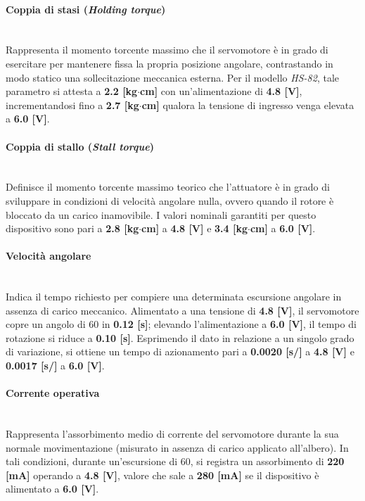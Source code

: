 \documentclass[11pt]{report}
\begin{document}
	\paragraph{Coppia di stasi (\textit{Holding torque})}\mbox{}\\
	Rappresenta il momento torcente massimo che il servomotore è in grado di esercitare per mantenere fissa la propria posizione angolare, contrastando in modo statico una sollecitazione meccanica esterna. Per il modello \textit{HS-82}, tale parametro si attesta a \textbf{2.2 [kg$\cdot$cm]} con un'alimentazione di \textbf{4.8 [V]}, incrementandosi fino a \textbf{2.7 [kg$\cdot$cm]} qualora la tensione di ingresso venga elevata a \textbf{6.0 [V]}.
	
	\paragraph{Coppia di stallo (\textit{Stall torque})}\mbox{}\\
	Definisce il momento torcente massimo teorico che l'attuatore è in grado di sviluppare in condizioni di velocità angolare nulla, ovvero quando il rotore è bloccato da un carico inamovibile. I valori nominali garantiti per questo dispositivo sono pari a \textbf{2.8 [kg$\cdot$cm]} a \textbf{4.8 [V]} e \textbf{3.4 [kg$\cdot$cm]} a \textbf{6.0 [V]}.
	
	\paragraph{Velocità angolare}\mbox{}\\
	Indica il tempo richiesto per compiere una determinata escursione angolare in assenza di carico meccanico. Alimentato a una tensione di \textbf{4.8 [V]}, il servomotore copre un angolo di 60\degree{} in \textbf{0.12 [s]}; elevando l'alimentazione a \textbf{6.0 [V]}, il tempo di rotazione si riduce a \textbf{0.10 [s]}. Esprimendo il dato in relazione a un singolo grado di variazione, si ottiene un tempo di azionamento pari a \textbf{0.0020 [s/\degree]} a \textbf{4.8 [V]} e \textbf{0.0017 [s/\degree]} a \textbf{6.0 [V]}.
	
	\paragraph{Corrente operativa}\mbox{}\\
	Rappresenta l'assorbimento medio di corrente del servomotore durante la sua normale movimentazione (misurato in assenza di carico applicato all'albero). In tali condizioni, durante un'escursione di 60\degree, si registra un assorbimento di \textbf{220 [mA]} operando a \textbf{4.8 [V]}, valore che sale a \textbf{280 [mA]} se il dispositivo è alimentato a \textbf{6.0 [V]}.
	
\end{document}
